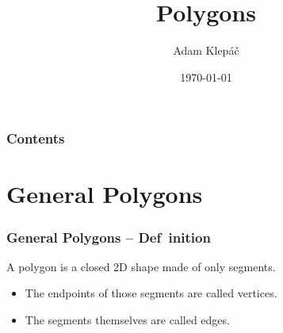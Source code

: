\documentclass[aspectratio=169,11pt,svgnames,handout]{beamer}
\title{Polygons}
\date{\today}
\author{Adam Klepáč}
\institute[GEVO]{Gymnázium Evolution Jižní Město}
\begin{document}
\titleframe

\begin{frame}
 \frametitle{Contents}
 \tableofcontents
\end{frame}

\section{General Polygons}
\label{sec:general-polygons}

\begin{frame}
 \frametitle{General Polygons -- Def~\hspace{-.4ex}inition}
 \begin{tcolorbox}[title=Polygon]
  A \alert{polygon} is a closed 2D shape made of only segments.
 \end{tcolorbox}
 \begin{itemize}
  \item<2-> The endpoints of those segments are called \alert{vertices}.
  \item<3-> The segments themselves are called \alert{edges}.
 \end{itemize}
\end{frame}
\end{document}
